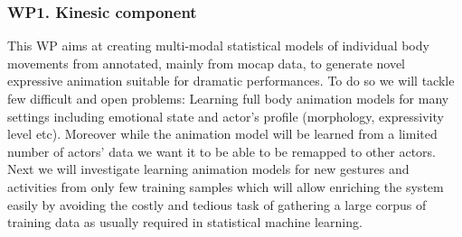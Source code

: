 % 
% 

\subsubsection{WP1. Kinesic component} 



This WP aims at creating multi-modal statistical models of individual body movements from annotated, mainly from mocap data, to generate novel expressive animation suitable for dramatic performances. 
To do so we will tackle few difficult and open problems: Learning full body animation models for many settings including  emotional state and actor's profile (morphology, expressivity level etc). 
Moreover while the animation model will be learned from a limited number of actors' data we want it to be able to be remapped to other actors. 
Next we will investigate learning animation models for new gestures and activities from only few training samples which will allow enriching the system easily by avoiding the costly and tedious task of gathering a large corpus of training data as
usually required in statistical machine learning.


